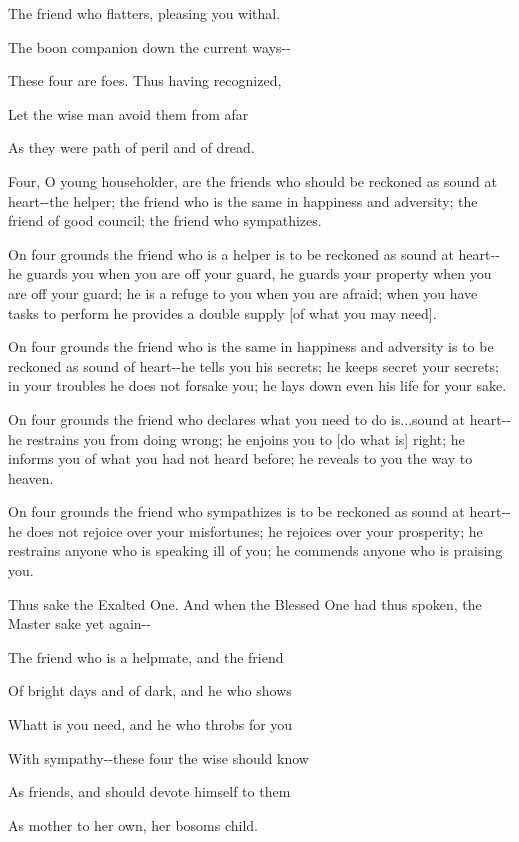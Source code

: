 \documentclass[12pt,twoside]{article}
\begin{document}
The friend who flatters, pleasing you withal.

The boon companion down the current ways{}-{}-

These four are foes. Thus having recognized,

Let the wise man avoid them from afar

As they were path of peril and of dread.


\bigskip

Four, O young householder, are the friends who should be reckoned as
sound at heart{}-{}-the helper; the friend who is the same in happiness
and adversity; the friend of good council; the friend who sympathizes.

On four grounds the friend who is a helper is to be reckoned as sound at
heart{}-{}-he guards you when you are off your guard, he guards your
property when you are off your guard; he is a refuge to you when you
are afraid; when you have tasks to perform he provides a double supply
[of what you may need].

On four grounds the friend who is the same in happiness and adversity is
to be reckoned as sound of heart{}-{}-he tells you his secrets; he
keeps secret your secrets; in your troubles he does not forsake you; he
lays down even his life for your sake.

On four grounds the friend who declares what you need to do is...sound
at heart{}-{}-he restrains you from doing wrong; he enjoins you to [do
what is] right; he informs you of what you had not heard before; he
reveals to you the way to heaven.

On four grounds the friend who sympathizes is to be reckoned as sound at
heart{}-{}-he does not rejoice over your misfortunes; he rejoices over
your prosperity; he restrains anyone who is speaking ill of you; he
commends anyone who is praising you.

Thus sake the Exalted One. And when the Blessed One had thus spoken, the
Master sake yet again{}-{}-


\bigskip

The friend who is a helpmate, and the friend

Of bright days and of dark, and he who shows

What{\textquotesingle}t is you need, and he who throbs for you

With sympathy{}-{}-these four the wise should know

As friends, and should devote himself to them

As mother to her own, her bosom{\textquotesingle}s child.
\end{document}
